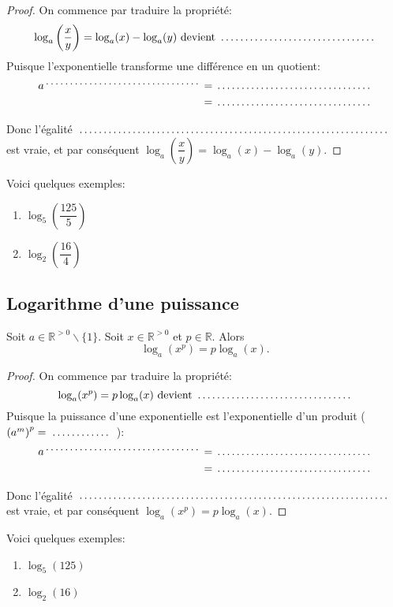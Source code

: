 \documentclass[a4paper,12pt,singlepage]{report}
\newcommand{\IR}{\mathbb{R}}
\newcommand{\jdot}[1]{ \makebox[#1]{\dotfill}}
\begin{document}
\begin{proof}
On commence par traduire la propriété:
\[
\log_a\left(\dfrac{x}{y}\right)=\log_a(x)-\log_a(y)\text{ devient }
\jdot{5cm}
\]
Puisque l'exponentielle transforme une différence en un quotient:
\begin{align*}
a^{\jdot{5cm}} &=\jdot{5cm}\\
&=\jdot{5cm}
\end{align*}

Donc l'égalité \(\jdot{10cm}\) est vraie, et par
conséquent  \(\log_a\left(\dfrac{x}{y}\right)=\log_a(x)-\log_a(y)\).
\end{proof}

\begin{exemple}
Voici quelques exemples:

\begin{enumerate}
\item \(\log_5\left(\dfrac{125}{5}\right)\)
\vspace{2cm}
\item \(\log_2\left(\dfrac{16}{4}\right)\)
\vspace{2cm}
\end{enumerate}
\end{exemple}
\subsection{Logarithme d'une puissance}
\label{sec:org8b88e1f}
\begin{propriete}
Soit \(a\in\IR^{>0}\backslash\{1\}\). Soit \(x\in\IR^{>0}\) et \(p\in\IR\). Alors
\[
\log_a(x^p)=p\log_a(x).
\]
\end{propriete}

\begin{proof}
On commence par traduire la propriété:
\[
\log_a(x^p)=p\log_a(x)\text{ devient }
\jdot{5cm}
\]
Puisque la puissance d'une exponentielle est l'exponentielle d'un produit (
   \(\left(a^{m}\right)^p=\jdot{2cm}\) ):
\begin{align*}
a^{\jdot{5cm}} &=\jdot{5cm}\\
&=\jdot{5cm}
\end{align*}

Donc l'égalité \(\jdot{10cm}\) est vraie, et par
conséquent  \(\log_a(x^p)=p\log_a(x)\).
\end{proof}

\begin{exemple}
Voici quelques exemples:

\begin{enumerate}
\item \(\log_5\left(125\right)\)
\vspace{2cm}
\item \(\log_2\left(16\right)\)
\vspace{2cm}
\end{enumerate}
\end{exemple}
\end{document}

